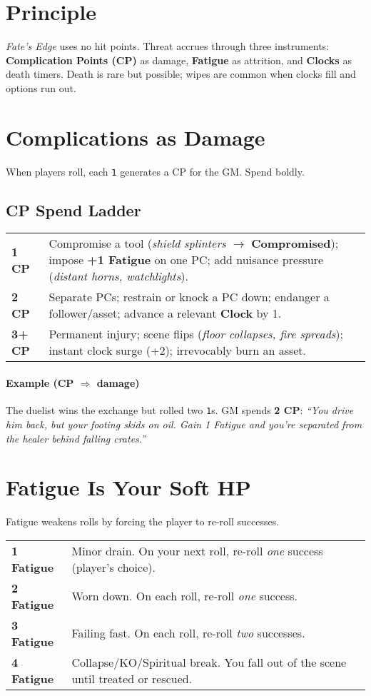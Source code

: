 \documentclass[12pt]{book}
\begin{document}
\section{Principle}
\emph{Fate's Edge} uses no hit points. Threat accrues through three instruments:
\textbf{Complication Points (CP)} as damage, \textbf{Fatigue} as attrition, and \textbf{Clocks} as death timers.
Death is rare but possible; wipes are common when clocks fill and options run out.

\section{Complications as Damage}
When players roll, each \texttt{1} generates a CP for the GM. Spend boldly.

\subsection*{CP Spend Ladder}
\begin{tabular}{@{}p{1.2cm}p{12cm}@{}}
\toprule
\textbf{1 CP} & Compromise a tool (\emph{shield splinters} $\rightarrow$ \textbf{Compromised}); impose \textbf{+1 Fatigue} on one PC; add nuisance pressure (\emph{distant horns, watchlights}).\\
\textbf{2 CP} & Separate PCs; restrain or knock a PC down; endanger a follower/asset; advance a relevant \textbf{Clock} by 1.\\
\textbf{3+ CP} & Permanent injury; scene flips (\emph{floor collapses, fire spreads}); instant clock surge (+2); irrevocably burn an asset.\\
\bottomrule
\end{tabular}

\paragraph{Example (CP $\Rightarrow$ damage)}
The duelist wins the exchange but rolled two \texttt{1}s. GM spends \textbf{2 CP}:
\emph{``You drive him back, but your footing skids on oil. Gain 1 Fatigue and you're separated from the healer behind falling crates.''}

\section{Fatigue Is Your Soft HP}
Fatigue weakens rolls by forcing the player to re-roll successes.

\begin{tabular}{@{}p{3cm}p{10.5cm}@{}}
\toprule
\textbf{1 Fatigue} & Minor drain. On your next roll, re-roll \emph{one} success (player's choice).\\
\textbf{2 Fatigue} & Worn down. On each roll, re-roll \emph{one} success.\\
\textbf{3 Fatigue} & Failing fast. On each roll, re-roll \emph{two} successes.\\
\textbf{4 Fatigue} & Collapse/KO/Spiritual break. You fall out of the scene until treated or rescued.\\
\bottomrule
\end{tabular}
\end{document}
